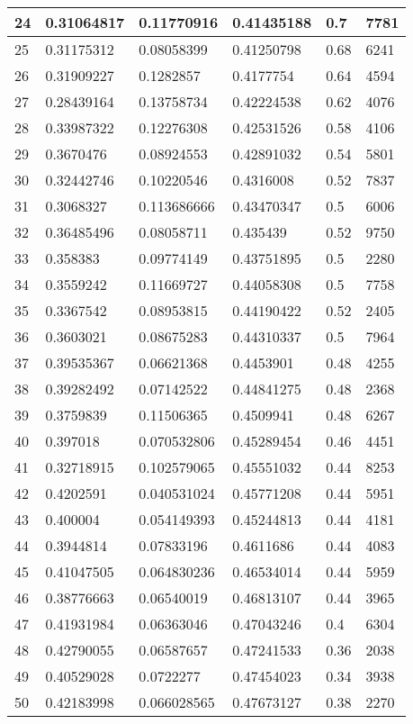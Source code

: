 \begin{longtable}{|l|l|l|l|l|l|}
24 & 0.31064817 & 0.11770916 & 0.41435188 & 0.7 & 7781 \\ \hline 
25 & 0.31175312 & 0.08058399 & 0.41250798 & 0.68 & 6241 \\ \hline 
26 & 0.31909227 & 0.1282857 & 0.4177754 & 0.64 & 4594 \\ \hline 
27 & 0.28439164 & 0.13758734 & 0.42224538 & 0.62 & 4076 \\ \hline 
28 & 0.33987322 & 0.12276308 & 0.42531526 & 0.58 & 4106 \\ \hline 
29 & 0.3670476 & 0.08924553 & 0.42891032 & 0.54 & 5801 \\ \hline 
30 & 0.32442746 & 0.10220546 & 0.4316008 & 0.52 & 7837 \\ \hline 
31 & 0.3068327 & 0.113686666 & 0.43470347 & 0.5 & 6006 \\ \hline 
32 & 0.36485496 & 0.08058711 & 0.435439 & 0.52 & 9750 \\ \hline 
33 & 0.358383 & 0.09774149 & 0.43751895 & 0.5 & 2280 \\ \hline 
34 & 0.3559242 & 0.11669727 & 0.44058308 & 0.5 & 7758 \\ \hline 
35 & 0.3367542 & 0.08953815 & 0.44190422 & 0.52 & 2405 \\ \hline 
36 & 0.3603021 & 0.08675283 & 0.44310337 & 0.5 & 7964 \\ \hline 
37 & 0.39535367 & 0.06621368 & 0.4453901 & 0.48 & 4255 \\ \hline 
38 & 0.39282492 & 0.07142522 & 0.44841275 & 0.48 & 2368 \\ \hline 
39 & 0.3759839 & 0.11506365 & 0.4509941 & 0.48 & 6267 \\ \hline 
40 & 0.397018 & 0.070532806 & 0.45289454 & 0.46 & 4451 \\ \hline 
41 & 0.32718915 & 0.102579065 & 0.45551032 & 0.44 & 8253 \\ \hline 
42 & 0.4202591 & 0.040531024 & 0.45771208 & 0.44 & 5951 \\ \hline 
43 & 0.400004 & 0.054149393 & 0.45244813 & 0.44 & 4181 \\ \hline 
44 & 0.3944814 & 0.07833196 & 0.4611686 & 0.44 & 4083 \\ \hline 
45 & 0.41047505 & 0.064830236 & 0.46534014 & 0.44 & 5959 \\ \hline 
46 & 0.38776663 & 0.06540019 & 0.46813107 & 0.44 & 3965 \\ \hline 
47 & 0.41931984 & 0.06363046 & 0.47043246 & 0.4 & 6304 \\ \hline 
48 & 0.42790055 & 0.06587657 & 0.47241533 & 0.36 & 2038 \\ \hline 
49 & 0.40529028 & 0.0722277 & 0.47454023 & 0.34 & 3938 \\ \hline 
50 & 0.42183998 & 0.066028565 & 0.47673127 & 0.38 & 2270 \\ \hline 
\end{longtable}